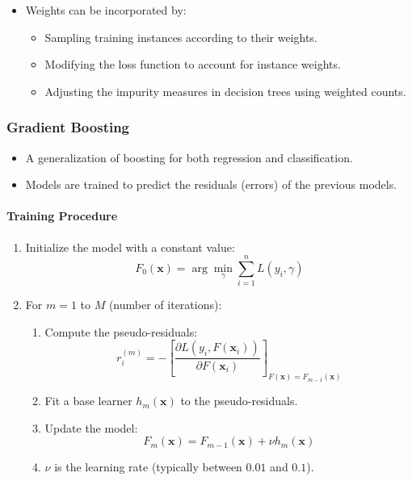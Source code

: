 \documentclass{article}
\begin{document}
\begin{itemize}
    \item Weights can be incorporated by:
    \begin{itemize}
        \item Sampling training instances according to their weights.
        \item Modifying the loss function to account for instance weights.
        \item Adjusting the impurity measures in decision trees using weighted counts.
    \end{itemize}
\end{itemize}

\subsubsection{Gradient Boosting}

\begin{itemize}
    \item A generalization of boosting for both regression and classification.
    \item Models are trained to predict the residuals (errors) of the previous models.
\end{itemize}

\paragraph{Training Procedure}

\begin{enumerate}
    \item Initialize the model with a constant value:
    \[
    F_0(\mathbf{x}) = \arg\min_{\gamma} \sum_{i=1}^n L(y_i, \gamma)
    \]
    \item For $m = 1$ to $M$ (number of iterations):
    \begin{enumerate}
        \item Compute the pseudo-residuals:
        \[
        r_i^{(m)} = -\left[ \frac{\partial L(y_i, F(\mathbf{x}_i))}{\partial F(\mathbf{x}_i)} \right]_{F(\mathbf{x}) = F_{m-1}(\mathbf{x})}
        \]
        \item Fit a base learner $h_m(\mathbf{x})$ to the pseudo-residuals.
        \item Update the model:
        \[
        F_m(\mathbf{x}) = F_{m-1}(\mathbf{x}) + \nu h_m(\mathbf{x})
        \]
        \item $\nu$ is the learning rate (typically between $0.01$ and $0.1$).
    \end{enumerate}
\end{enumerate}
\end{document}
